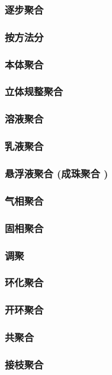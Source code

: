 \documentclass[UTF8]{../../ApplicationUniverse}
\begin{document}
            \subsubsection{逐步聚合}
        \subsubsection{按方法分}
            \subsubsection{本体聚合}
            \subsubsection{立体规整聚合}
            \subsubsection{溶液聚合}
            \subsubsection{乳液聚合}
            \subsubsection{悬浮液聚合 (成珠聚合 )}
            \subsubsection{气相聚合}
            \subsubsection{固相聚合}
            \subsubsection{调聚}
            \subsubsection{环化聚合}
            \subsubsection{开环聚合}
            \subsubsection{共聚合}
            \subsubsection{接枝聚合}
\end{document}

